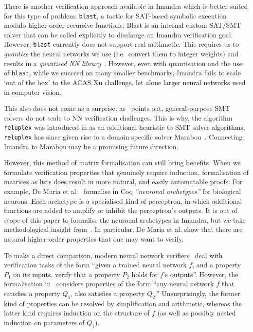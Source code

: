 \documentclass[runningheads]{llncs}
\begin{document}
There is another verification approach available in Imandra which is better suited for this type of problem:  \lstinline{blast}, a tactic for SAT-based symbolic execution modulo
higher-order recursive functions. Blast is an internal custom SAT/SMT solver that can be called explicitly to discharge an Imandra verification goal.
 However, \lstinline{blast} currently does not support real arithmetic. This
 requires us to \emph{quantize} the neural networks we use (i.e.\ convert them to
 integer weights) and results in a \emph{quantised NN library}~\cite{DPKD22}.
 However, even with quantisation and the use of  \lstinline{blast}, while we succeed on many smaller benchmarks, Imandra fails to scale `out of the box' to the ACAS Xu challenge, let alone larger neural networks used in computer vision.

 This also does not come as a surprise: as~\cite{KaBaDiJuKo17Reluplex} points out, general-purpose SMT solvers do not scale to NN verification challenges.
This is why, the algorithm \lstinline{reluplex} was introduced in \cite{KaBaDiJuKo17Reluplex} as an additional heuristic to SMT solver algorithms;
\lstinline{reluplex} has since given rise to a domain specific solver Marabou~\cite{KatzHIJLLSTWZDK19}.
Connecting Imandra to Marabou may be a promising future direction. 

However, this method of matrix formalisation can still bring benefits. When
we formulate verification properties that genuinely require induction,
formalisation of matrices as lists does result in more natural, and easily
automatable proofs. For example, De Maria et al.~\cite{MariaBLFGRG22} formalise
in Coq \emph{``neuronal archetypes''} for biological neurons. Each archetype is
a specialised kind of perceptron, in which additional functions are added to
amplify or inhibit the perceptron's outputs. It is out of scope of this paper to
formalise the neuronal archetypes in Imandra, but we take methodological insight
from~\cite{MariaBLFGRG22}. In particular, De Maria et al. show that there
are natural higher-order properties that one may want to verify.

To make a direct comparison, modern neural network
verifiers~\cite{KaBaDiJuKo17Reluplex,SinghGPV19} deal with verification tasks of
the form ``given a trained neural network $f$, and a property $P_1$ on its
inputs, verify that a property $P_2$ holds for $f$'s outputs''. However, the
formalisation in~\cite{MariaBLFGRG22} considers properties of the form ``any
neural network $f$ that satisfies a property $Q_1$, also satisfies a property
$Q_2$.'' Unsurprisingly, the former kind of properties can be resolved by
simplification and arithmetic, whereas the latter kind requires
induction on the structure of $f$ (as well as possibly nested induction on
parameters of $Q_1$).
\end{document}
